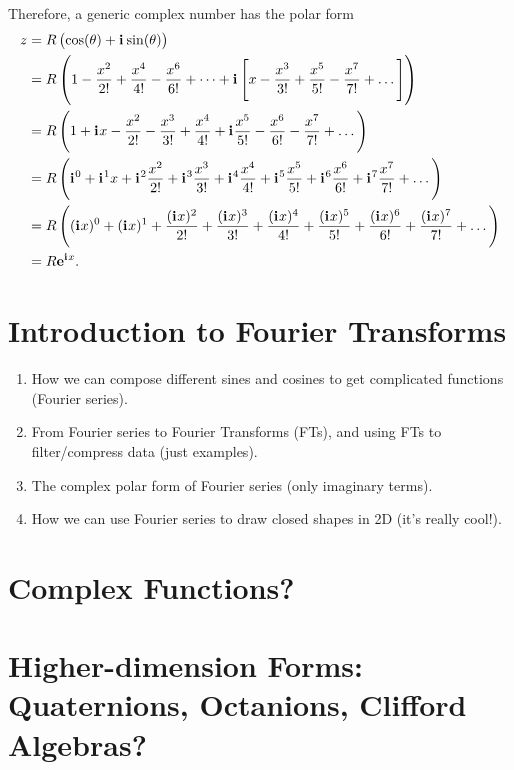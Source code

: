 \documentclass{article}
\newcommand{\iu}{\mathbf{i}\mkern1mu}
\newcommand{\Eu}[1]{\mathbf{e}^{#1}}
\begin{document}
Therefore, a generic complex number has the polar form
\begin{equation}
	\begin{aligned}
		z & = R \left( \cos(\theta) + \iu\sin(\theta) \right)                                                                                                                                       \\
		  & = R \left(1 - \frac{x^2}{2!} + \frac{x^4}{4!} - \frac{x^6}{6!} + \dots + \iu\left[x-\frac{x^3}{3!}+\frac{x^5}{5!} - \frac{x^7}{7!} + \dots\right] \right)                               \\
		  & = R\left(1 + \iu x - \frac{x^2}{2!} - \frac{x^3}{3!} + \frac{x^4}{4!} + \iu\frac{x^5}{5!} - \frac{x^6}{6!} - \frac{x^7}{7!} + \dots \right)                                             \\
		  & = R\left(\iu^0 + \iu^1 x + \iu^2 \frac{x^2}{2!} + \iu^3 \frac{x^3}{3!} + \iu^4 \frac{x^4}{4!} + \iu^5 \frac{x^5}{5!} + \iu^6 \frac{x^6}{6!} + \iu^7 \frac{x^7}{7!} + \dots \right)      \\
		  & = R\left((\iu x)^0 + (\iu x)^1 + \frac{(\iu x)^2}{2!} + \frac{(\iu x)^3}{3!} + \frac{(\iu x)^4}{4!} + \frac{(\iu x)^5}{5!} + \frac{(\iu x)^6}{6!} + \frac{(\iu x)^7}{7!} + \dots\right) \\
		  & = R\Eu{\iu x}.
	\end{aligned}
	\label{eq:}
\end{equation}


\section{Introduction to Fourier Transforms}
\begin{enumerate}
	\item How we can compose different sines and cosines to get complicated functions (Fourier series).
	\item From Fourier series to Fourier Transforms (FTs), and using FTs to filter/compress data (just examples).
	\item The complex polar form of Fourier series (only imaginary terms).
	\item How we can use Fourier series to draw closed shapes in 2D (it's really cool!).
\end{enumerate}

\section{Complex Functions?}
\section{Higher-dimension Forms: Quaternions, Octanions, Clifford Algebras?}
\end{document}
